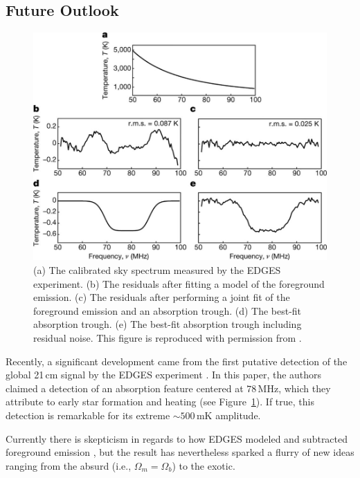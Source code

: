\begin{bibunit}
\section{Future Outlook}\label{sec:intro-future-outlook}

\begin{figure}[t]
    \centering
    \includegraphics[width=\textwidth]{figures/chapter1/bowman-2018-absorption-trough}
    \caption{
        (a) The calibrated sky spectrum measured by the EDGES experiment.
        (b) The residuals after fitting a model of the foreground emission.
        (c) The residuals after performing a joint fit of the foreground emission and an absorption
        trough.
        (d) The best-fit absorption trough.
        (e) The best-fit absorption trough including residual noise.
        This figure is reproduced with permission from \citet{2018Natur.555...67B}.
    }
    \label{fig:bowman-absorption-trough}
\end{figure}

Recently, a significant development came from the first putative detection of the global 21\,cm
signal by the EDGES experiment \citep{2018Natur.555...67B}. In this paper, the authors claimed a
detection of an absorption feature centered at $78\,\text{MHz}$, which they attribute to early star
formation and heating (see Figure~\ref{fig:bowman-absorption-trough}). If true, this detection is
remarkable for its extreme $\sim500\,\text{mK}$ amplitude.

Currently there is skepticism in regards to how EDGES modeled and subtracted foreground emission
\citep{2018arXiv180501421H}, but the result has nevertheless sparked a flurry of new ideas ranging
from the absurd (i.e., $\Omega_m = \Omega_b$) to the exotic.


\end{bibunit}
